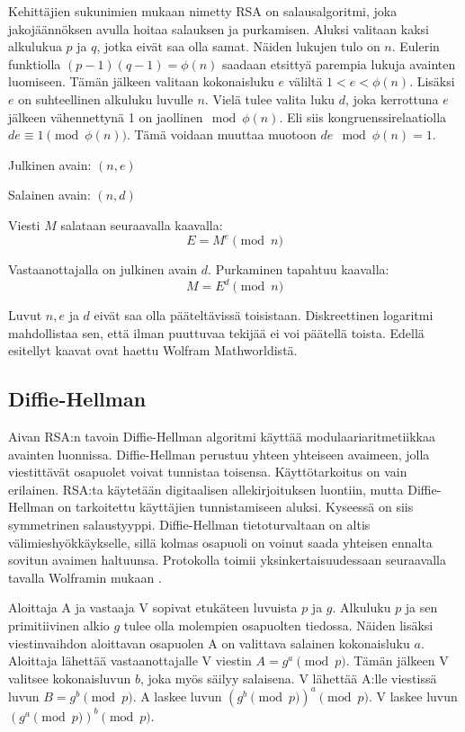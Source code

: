 \documentclass[finnish]{tktltiki2}
\theoremstyle{definition}
\theoremstyle{remark}
\begin{document}
Kehittäjien sukunimien mukaan nimetty RSA on salausalgoritmi, joka jakojäännöksen avulla hoitaa salauksen ja purkamisen. Aluksi valitaan kaksi alkulukua $p$ ja $q$, jotka eivät saa olla samat. Näiden lukujen tulo on $n$. Eulerin funktiolla $(p-1)(q-1) = \phi(n)$ saadaan etsittyä parempia lukuja avainten luomiseen. Tämän jälkeen valitaan kokonaisluku $e$ väliltä $1 < e < \phi(n)$. Lisäksi $e$ on suhteellinen alkuluku luvulle $n$. Vielä tulee valita luku $d$, joka kerrottuna $e$ jälkeen vähennettynä 1 on jaollinen$\mod{\phi(n)}$. Eli siis kongruenssirelaatiolla $d e \equiv 1\pmod{\phi(n)}$. Tämä voidaan muuttaa muotoon $de \mod{\phi(n)} = 1$.

Julkinen avain: $(n, e)$

Salainen avain: $(n, d)$  

Viesti $M$ salataan seuraavalla kaavalla: $$E = M^e \pmod{n}$$

Vastaanottajalla on julkinen avain $d$. Purkaminen tapahtuu kaavalla: 
$$ M = E^d \pmod{n} $$

Luvut $n, e$ ja $d$ eivät saa olla pääteltävissä toisistaan. Diskreettinen logaritmi mahdollistaa sen, että ilman puuttuvaa tekijää ei voi päätellä toista. Edellä esitellyt kaavat ovat haettu Wolfram Mathworldistä. \cite{math1}


\subsection{Diffie-Hellman}

Aivan RSA:n tavoin Diffie-Hellman algoritmi käyttää modulaariaritmetiikkaa avainten luonnissa. Diffie-Hellman perustuu yhteen yhteiseen avaimeen, jolla viestittävät osapuolet voivat tunnistaa toisensa. Käyttötarkoitus on vain erilainen. RSA:ta käytetään digitaalisen allekirjoituksen luontiin, mutta Diffie-Hellman on tarkoitettu käyttäjien tunnistamiseen aluksi. Kyseessä on siis symmetrinen salaustyyppi. Diffie-Hellman tietoturvaltaan on altis välimieshyökkäykselle, sillä kolmas osapuoli on voinut saada yhteisen ennalta sovitun avaimen haltuunsa. Protokolla toimii yksinkertaisuudessaan seuraavalla tavalla Wolframin mukaan \cite{math2}.

Aloittaja A ja vastaaja V sopivat etukäteen luvuista $p$ ja $g$. Alkuluku  $p$ ja sen primitiivinen alkio $g$ tulee olla molempien osapuolten tiedossa. Näiden lisäksi viestinvaihdon aloittavan osapuolen A on valittava salainen kokonaisluku $a$. Aloittaja lähettää vastaanottajalle V viestin $A = g^a \pmod{p}$. Tämän jälkeen V valitsee kokonaisluvun $b$, joka myös säilyy salaisena. V lähettää A:lle viestissä luvun $B = g^b \pmod{p}$. A laskee luvun $(g^b \pmod{p})^a \pmod{p}$. V laskee luvun $(g^a \pmod{p})^b \pmod{p}$.
\end{document}
